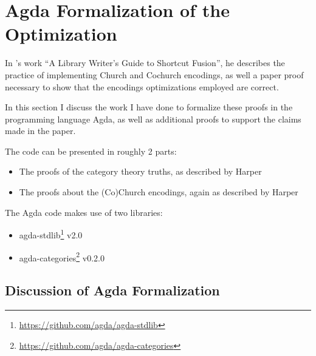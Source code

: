 \section{Agda Formalization of the Optimization}\label{sec:formalization}
In \cite{Harper2011}'s work ``A Library Writer's Guide to Shortcut Fusion'', he describes the practice of implementing Church and Cochurch encodings, as well a paper proof necessary to show that the encodings optimizations employed are correct.

In this section I discuss the work I have done to formalize these proofs in the programming language Agda, as well as additional proofs to support the claims made in the paper.

The code can be presented in roughly 2 parts:
\begin{itemize}
  \item The proofs of the category theory truths, as described by Harper
  \item The proofs about the (Co)Church encodings, again as described by Harper
\end{itemize}

The Agda code makes use of two libraries:
\begin{itemize}[noitemsep]
  \item agda-stdlib\footnote{\url{https://github.com/agda/agda-stdlib}} v2.0
  \item agda-categories\footnote{\url{https://github.com/agda/agda-categories}} v0.2.0
\end{itemize}




\subsection{Discussion of Agda Formalization}
